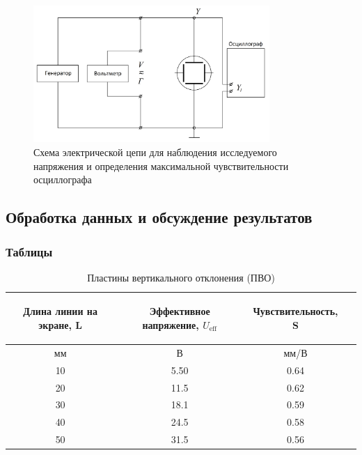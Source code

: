\begin{figure}[H]
\centering
\includegraphics[width=0.8\textwidth]{Scheme4.png}
\caption{Схема электрической цепи для наблюдения исследуемого напряжения и определения максимальной чувствительности осциллографа}
\label{fig:Scheme4}
\end{figure}

\subsection{Обработка данных и обсуждение результатов}
 
\subsubsection{Таблицы}

\begin{center}
\begin{table}[H]
\centering
\caption{Пластины вертикального отклонения (ПВО)}
\label{tabl:1}
\begin{tabular}{|c|c|c|c|}
\hline
\begin{minipage}{5cm}
\begin{center}
    Длина линии на экране, L
\end{center}
\end{minipage} &
\begin{minipage}{5cm}
\begin{center}
    Эффективное напряжение, $U_{\text{eff}}$
\end{center}
\end{minipage} &
\begin{minipage}{5cm}
\begin{center}
    Чувствительность, S
\end{center}
\end{minipage}\\
\hline
мм&В&мм/В\\
\hline
10  &  5.50  &  0.64 \\
20  &  11.5  &  0.62 \\
30  &  18.1  &  0.59 \\
40  &  24.5  &  0.58 \\
50  &  31.5  &  0.56 \\
\hline
\end{tabular}
\end{table}
\end{center}

